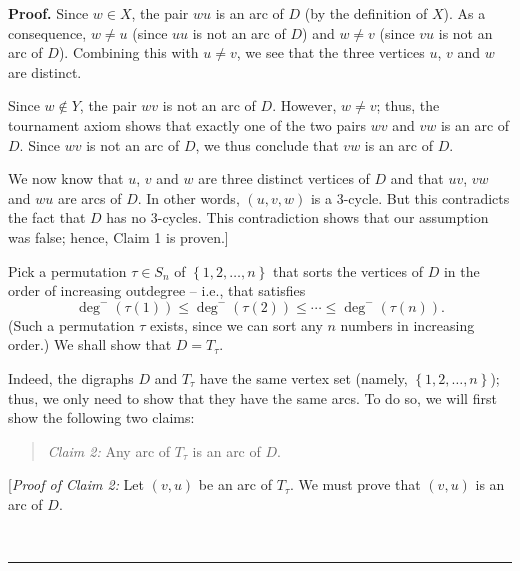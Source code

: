 \documentclass[numbers=enddot,12pt,final,onecolumn,notitlepage]{scrartcl}%
\numberwithin{exer}{subsection}
\theoremstyle{definition}
\newenvironment{statement}{\begin{quote}}{\end{quote}}
\newenvironment{proof}[1][Proof]{\noindent\textbf{#1.} }{\ \rule{0.5em}{0.5em}}
\begin{document}
\begin{proof}
Since $w\in X$, the pair $wu$ is an arc of $D$ (by the definition of $X$). As
a consequence, $w\neq u$ (since $uu$ is not an arc of $D$) and $w\neq v$
(since $vu$ is not an arc of $D$). Combining this with $u\neq v$, we see that
the three vertices $u$, $v$ and $w$ are distinct.

Since $w\notin Y$, the pair $wv$ is not an arc of $D$. However, $w\neq v$;
thus, the tournament axiom shows that exactly one of the two pairs $wv$ and
$vw$ is an arc of $D$. Since $wv$ is not an arc of $D$, we thus conclude that
$vw$ is an arc of $D$.

We now know that $u$, $v$ and $w$ are three distinct vertices of $D$ and that
$uv$, $vw$ and $wu$ are arcs of $D$. In other words, $\left(  u,v,w\right)  $
is a $3$-cycle. But this contradicts the fact that $D$ has no $3$-cycles. This
contradiction shows that our assumption was false; hence, Claim 1 is proven.]
\medskip

Pick a permutation $\tau\in S_{n}$ of $\left\{  1,2,\ldots,n\right\}  $ that
sorts the vertices of $D$ in the order of increasing outdegree -- i.e., that
satisfies%
\begin{equation}
\deg^{-}\left(  \tau\left(  1\right)  \right)  \leq\deg^{-}\left(  \tau\left(
2\right)  \right)  \leq\cdots\leq\deg^{-}\left(  \tau\left(  n\right)
\right)  . \label{pf.thm.Tsig.props.b.chain}%
\end{equation}
(Such a permutation $\tau$ exists, since we can sort any $n$ numbers in
increasing order.) We shall show that $D=T_{\tau}$.

Indeed, the digraphs $D$ and $T_{\tau}$ have the same vertex set (namely,
$\left\{  1,2,\ldots,n\right\}  $); thus, we only need to show that they have
the same arcs. To do so, we will first show the following two claims:

\begin{statement}
\textit{Claim 2:} Any arc of $T_{\tau}$ is an arc of $D$.
\end{statement}

[\textit{Proof of Claim 2:} Let $\left(  v,u\right)  $ be an arc of $T_{\tau}%
$. We must prove that $\left(  v,u\right)  $ is an arc of $D$.


\end{proof}
\end{document}
